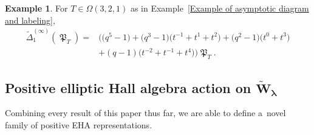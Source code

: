 \documentclass[10pt,a4paper]{amsart}
\numberwithin{equation}{section}
\theoremstyle{definition}
\newtheorem{Example}[Theorem]{Example}
\DeclareMathOperator{\MacD}{\mathfrak{P}}
\begin{document}
\begin{Example}
 For $T \in \Omega(3,2,1)$ as in Example~\ref{Example of asymptotic diagram and labeling},
 \begin{align*}
 \widetilde{\Delta}_{1}^{(\infty)}(\MacD_T) ={}& \bigl( \bigl(q^5-1\bigr) + \bigl(q^3-1\bigr)\bigl(t^{-1}+t^1+t^2\bigr) + \bigl(q^2-1\bigr)\bigl(t^0+t^3\bigr)\\
 &+ (q-1)\bigl(t^{-2}+t^{-1}+t^4\bigr)\bigr)\MacD_T.
 \end{align*}

\end{Example}


\subsection[Positive elliptic Hall algebra action on W\_lambda]{Positive elliptic Hall algebra action on $\boldsymbol{\widetilde{W}_{\lambda}}$}

Combining every result of this paper thus far, we are able to define a~novel family of positive EHA representations.
\end{document}
